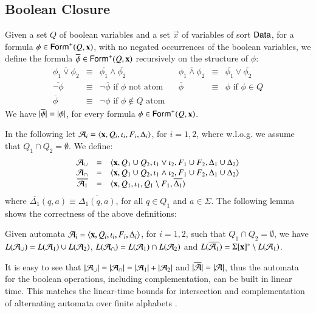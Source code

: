 \documentclass[10pt,conference,letterpaper,twocolumn]{IEEEtran}
\begin{document}
\subsection{Boolean Closure}

Given a set $Q$ of boolean variables and a set $\vec{x}$ of variables
of sort $\mathsf{Data}$, for a formula $\phi \in \mathsf{Form}^+(Q,\mathbf x)$, with no
negated occurrences of the boolean variables, we define the formula
$\overline{\phi} \in \mathsf{Form}^+(Q,\mathbf x)$ recursively on the structure
of $\phi$:
\[\begin{array}{lclclcl}
\overline{\phi_1 \vee \phi_2} & \equiv & \overline{\phi_1} \wedge \overline{\phi_2} && 
\overline{\phi_1 \wedge \phi_2} & \equiv & \overline{\phi_1} \vee \overline{\phi_2} \\ 
\overline{\neg\phi} & \equiv & \neg \overline{\phi} \text{ if $\phi$ not atom} &&
\overline{\phi} & \equiv & \phi \text{ if $\phi \in Q$} \\
\overline{\phi} & \equiv & \neg\phi \text{ if $\phi \not\in Q$ atom}
\end{array}\]
We have ${|{\overline{\phi}}|} = {|{\phi}|}$, for every formula $\phi
\in \mathsf{Form}^+(Q,\mathbf x)$.

In the following let $\mathcal{A}_i =
\left\langle \mathbf x,Q_i,\iota_i,F_i,\Delta_i \right\rangle$, for $i=1,2$, where
w.l.o.g. we assume that $Q_1 \cap Q_2 = \emptyset$. We define:
\[\begin{array}{rcl}
\mathcal{A}_\cup & = & \left\langle \mathbf x,Q_1\cup Q_2,\iota_1 \vee \iota_2,F_1\cup F_2,\Delta_1\cup\Delta_2 \right\rangle \\ 
\mathcal{A}_\cap & = & \left\langle \mathbf x,Q_1\cup Q_2,\iota_1 \wedge \iota_2, F_1\cup F_2, \Delta_1\cup\Delta_2 \right\rangle \\ 
\overline{\mathcal{A}_1} & = & \langle \mathbf x,Q_1,\iota_1,Q_1\setminus F_1,\overline{\Delta_1} \rangle
\end{array}\] 
where $\overline{\Delta_1}(q,a) \equiv \overline{\Delta_1(q,a)}$, for
all $q \in Q_1$ and $a \in \Sigma$. The following lemma shows the
correctness of the above definitions:

\begin{lemma}\label{lemma:closure}
  Given automata $\mathcal{A}_i = \left\langle \mathbf x,Q_i,\iota_i,F_i,\Delta_i \right\rangle$,
  for $i=1,2$, such that $Q_1 \cap Q_2 = \emptyset$, we have
  $L(\mathcal{A}_\cup) = L(\mathcal{A}_1) \cup L(\mathcal{A}_2)$, $L(\mathcal{A}_\cap) = L(\mathcal{A}_1) \cap
  L(\mathcal{A}_2)$ and $L(\overline{\mathcal{A}_1}) = \Sigma[\mathbf x]^* \setminus
  L(\mathcal{A}_1)$.
\end{lemma}

It is easy to see that ${|{\mathcal{A}_\cup}|} = {|{\mathcal{A}_\cap}|} = {|{\mathcal{A}_1}|} +
{|{\mathcal{A}_2}|}$ and ${|{\overline{\mathcal{A}}}|} = {|{\mathcal{A}}|}$, thus the automata
for the boolean operations, including complementation, can be built in
linear time. This matches the linear-time bounds for intersection and
complementation of alternating automata over finite alphabets
\cite{ChandraKozenStockmeyer81}.
\end{document}
